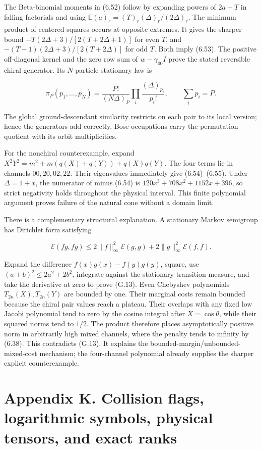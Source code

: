 The Beta-binomial moments in (6.52) follow by expanding powers of \(2a-T\) in falling factorials and using \(\mathbb E(a)_{\underline r}=(T)_{\underline r}(\Delta)_r/(2\Delta)_r\). The minimum product of centered squares occurs at opposite extremes. It gives the sharper bound \(-T(2\Delta+3)/[2(T+2\Delta+1)]\) for even \(T\), and \(-(T-1)(2\Delta+3)/[2(T+2\Delta)]\) for odd \(T\). Both imply (6.53). The positive off-diagonal kernel and the zero row sum of \(w-\gamma_{00}I\) prove the stated reversible chiral generator. Its \(N\)-particle stationary law is

\[
\pi_P(p_1,\ldots,p_N)=\frac{P!}{(N\Delta)_P}
\prod_i\frac{(\Delta)_{p_i}}{p_i!},\qquad \sum_ip_i=P.
\tag{G.12}
\]

The global ground-descendant similarity restricts on each pair to its local version; hence the generators add correctly. Bose occupations carry the permutation quotient with its orbit multiplicities.

For the nonchiral counterexample, expand \(X^2Y^2=m^2+m(q(X)+q(Y))+q(X)q(Y)\). The four terms lie in channels \(00,20,02,22\). Their eigenvalues immediately give (6.54)--(6.55). Under \(\Delta=1+x\), the numerator of minus (6.54) is \(120x^3+708x^2+1152x+396\), so strict negativity holds throughout the physical interval. This finite polynomial argument proves failure of the natural cone without a domain limit.

There is a complementary structural explanation. A stationary Markov semigroup has Dirichlet form satisfying

\[
\mathcal E(fg,fg)\le2\|f\|_\infty^2\mathcal E(g,g)
+2\|g\|_\infty^2\mathcal E(f,f).
\tag{G.13}
\]

Expand the difference \(f(x)g(x)-f(y)g(y)\), square, use \((a+b)^2\le2a^2+2b^2\), integrate against the stationary transition measure, and take the derivative at zero to prove (G.13). Even Chebyshev polynomials \(T_{2n}(X),T_{2n}(Y)\) are bounded by one. Their marginal costs remain bounded because the chiral pair values reach a plateau. Their overlaps with any fixed low Jacobi polynomial tend to zero by the cosine integral after \(X=\cos\theta\), while their squared norms tend to \(1/2\). The product therefore places asymptotically positive norm in arbitrarily high mixed channels, where the penalty tends to infinity by (6.38). This contradicts (G.13). It explains the bounded-margin/unbounded-mixed-cost mechanism; the four-channel polynomial already supplies the sharper explicit counterexample.

\clearpage
\hypertarget{appendix-k.-collision-flags-logarithmic-symbols-physical-tensors-and-exact-ranks}{%
\section{Appendix K. Collision flags, logarithmic symbols, physical tensors, and exact ranks}\label{appendix-k.-collision-flags-logarithmic-symbols-physical-tensors-and-exact-ranks}}

